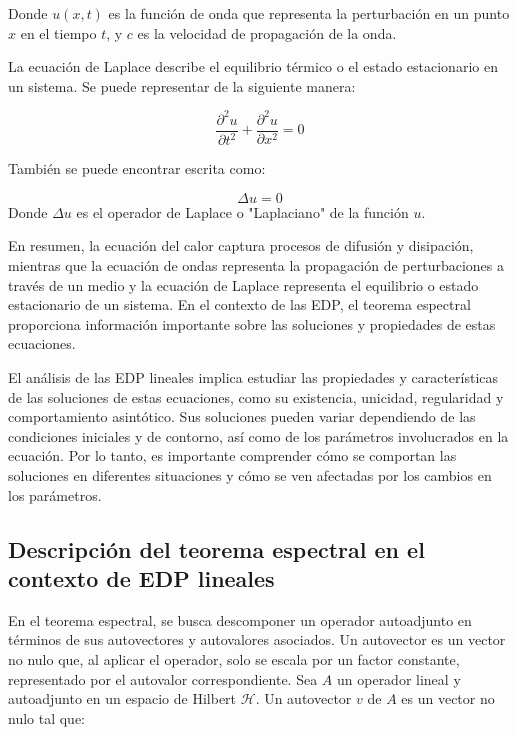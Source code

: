 \documentclass{article}
\begin{document}
        Donde $u(x,t)$ es la función de onda que representa la perturbación en un punto $x$ en el tiempo $t$, y $c$ es la velocidad de propagación de la onda.

    La ecuación de Laplace describe el equilibrio térmico o el estado estacionario en un sistema. Se puede representar de la siguiente manera:

        \begin{equation}
            \frac{\partial^2 u}{\partial t^2} + \frac{\partial^2 u}{\partial x^2}= 0
        \end{equation}

    También se puede encontrar escrita como:

        \begin{equation}
            \Delta u = 0
            \end{equation}
    Donde $\Delta u$ es el operador de Laplace o "Laplaciano" de la función $u$.

    En resumen, la ecuación del calor captura procesos de difusión y disipación, mientras que la ecuación de ondas representa la propagación de perturbaciones a través de un medio y la ecuación de Laplace representa el equilibrio o estado estacionario de un sistema. En el contexto de las EDP, el teorema espectral proporciona información importante sobre las soluciones y propiedades de estas ecuaciones.

    El análisis de las EDP lineales implica estudiar las propiedades y características de las soluciones de estas ecuaciones, como su existencia, unicidad, regularidad y comportamiento asintótico. Sus soluciones pueden variar dependiendo de las condiciones iniciales y de contorno, así como de los parámetros involucrados en la ecuación. Por lo tanto, es importante comprender cómo se comportan las soluciones en diferentes situaciones y cómo se ven afectadas por los cambios en los parámetros.

    \subsection{Descripción del teorema espectral en el contexto de EDP lineales}

    En el teorema espectral, se busca descomponer un operador autoadjunto en términos de sus autovectores y autovalores asociados. Un autovector es un vector no nulo que, al aplicar el operador, solo se escala por un factor constante, representado por el autovalor correspondiente.
    Sea $A$ un operador lineal y autoadjunto en un espacio de Hilbert $\mathcal{H}$. Un autovector $v$ de $A$ es un vector no nulo tal que:
\end{document}
